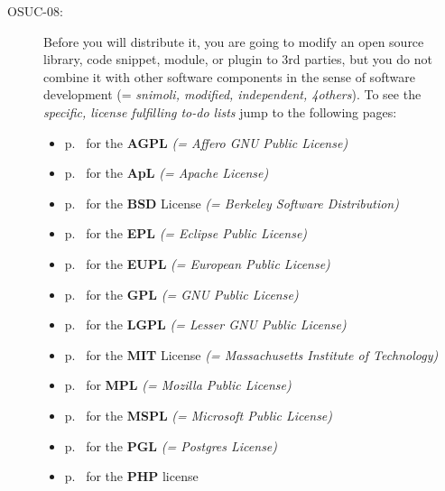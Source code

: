 \begin{description}
\item[OSUC-08:]\label{OSUC-08-DEF} Before you will distribute it, you are going
to modify an open source library, code snippet, module, or plugin to 3rd
parties, but you do not combine it with other software components in the sense of
software development (= \textit{snimoli, modified, independent, 4others}). 
To see the \textit{specific, license fulfilling to-do lists} jump to the
following pages:
  \begin{itemize}
    \item p.\ \pageref{OSUC-08-AGPL} for the \textbf{AGPL}
      \textit{(= Affero GNU Public License)} 
    \item p.\ \pageref{OSUC-08-Apache20} for the \textbf{ApL}
      \textit{(= Apache License)}
    \item p.\ \pageref{OSUC-08-BSD} for the \textbf{BSD} License
      \textit{(= Berkeley Software Distribution)}
    \item p.\ \pageref{OSUC-08-EPL} for the \textbf{EPL}
      \textit{(= Eclipse Public License)}     
    \item p.\ \pageref{OSUC-08-EUPL} for the \textbf{EUPL}
      \textit{(= European Public License)} 
    \item p.\ \pageref{OSUC-08-GPL} for the \textbf{GPL}
       \textit{(= GNU Public License)} 
    \item p.\ \pageref{OSUC-08-LGPL} for the \textbf{LGPL}
      \textit{(= Lesser GNU Public License)}           
    \item p.\ \pageref{OSUC-08-MIT} for the \textbf{MIT} License
       \textit{(= Massachusetts Institute of Technology)} 
    \item p.\ \pageref{OSUC-08-MPL} for \textbf{MPL}
      \textit{(= Mozilla Public License)}     
    \item p.\ \pageref{OSUC-08-MsPL} for the \textbf{MSPL}
      \textit{(= Microsoft Public License)} 
    \item p.\ \pageref{OSUC-08-PGL} for the \textbf{PGL}
      \textit{(= Postgres License)} 
    \item p.\ \pageref{OSUC-08-PHP} for the \textbf{PHP} license 
  \end{itemize}



\end{description}
